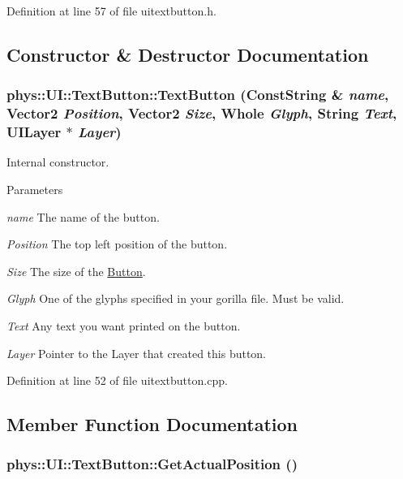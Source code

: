 Definition at line 57 of file uitextbutton.h.



\subsection{Constructor \& Destructor Documentation}
\hypertarget{classphys_1_1UI_1_1TextButton_a399ee921d2280771173e5e319c1d3f9e}{
\subsubsection[{TextButton}]{\setlength{\rightskip}{0pt plus 5cm}phys::UI::TextButton::TextButton ({\bf ConstString} \& {\em name}, \/  {\bf Vector2} {\em Position}, \/  {\bf Vector2} {\em Size}, \/  {\bf Whole} {\em Glyph}, \/  {\bf String} {\em Text}, \/  {\bf UILayer} $\ast$ {\em Layer})}}
\label{df/d03/classphys_1_1UI_1_1TextButton_a399ee921d2280771173e5e319c1d3f9e}


Internal constructor. 


\begin{DoxyParams}{Parameters}
\item[{\em name}]The name of the button. \item[{\em Position}]The top left position of the button. \item[{\em Size}]The size of the \hyperlink{classphys_1_1UI_1_1Button}{Button}. \item[{\em Glyph}]One of the glyphs specified in your gorilla file. Must be valid. \item[{\em Text}]Any text you want printed on the button. \item[{\em Layer}]Pointer to the Layer that created this button. \end{DoxyParams}


Definition at line 52 of file uitextbutton.cpp.



\subsection{Member Function Documentation}
\hypertarget{classphys_1_1UI_1_1TextButton_ab406bec58bf6244c3e867fefd19d4d7f}{
\subsubsection[{GetActualPosition}]{ phys::UI::TextButton::GetActualPosition ()}}
\label{df/d03/classphys_1_1UI_1_1TextButton_ab406bec58bf6244c3e867fefd19d4d7f}


